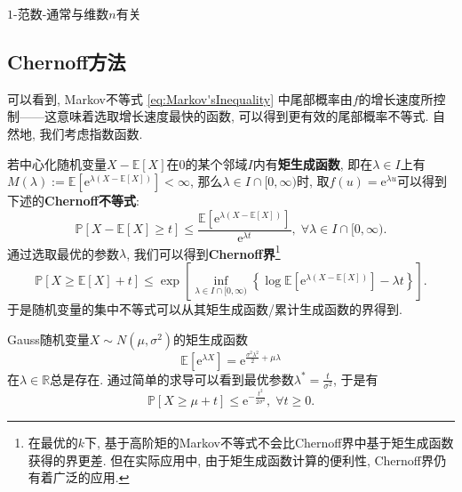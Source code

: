 $1$-范数-通常与维数$n$有关




\subsection{Chernoff方法}

可以看到, Markov不等式 \eqref{eq:Markov'sInequality} 中尾部概率由$f$的增长速度所控制——这意味着选取增长速度最快的函数, 可以得到更有效的尾部概率不等式. 
自然地, 我们考虑指数函数. 

若中心化随机变量$X - \mathbb{E}[X]$在$0$的某个邻域$I$内有\textbf{矩生成函数}, 即在$\lambda \in I$上有$M(\lambda) := \mathbb{E}[\mathrm{e}^{\lambda (X - \mathbb{E}[X])}] < \infty$, 那么$\lambda \in I \cap [0, \infty)$时, 取$f(u) = \mathrm{e}^{\lambda u}$可以得到下述的\textbf{Chernoff不等式}: 
\begin{equation*}
	\mathbb{P}[X - \mathbb{E}[X] \geq t] 
	\leq \frac{\mathbb{E}[\mathrm{e}^{\lambda(X - \mathbb{E}[X])}]}{\mathrm{e}^{\lambda t}},\;
	\forall \lambda \in I \cap [0, \infty).
\end{equation*}
通过选取最优的参数$\lambda$, 我们可以得到\textbf{Chernoff界}\footnote{在最优的$k$下, 基于高阶矩的Markov不等式不会比Chernoff界中基于矩生成函数获得的界更差. 但在实际应用中, 由于矩生成函数计算的便利性, Chernoff界仍有着广泛的应用.}
\begin{equation*}
	\mathbb{P}[X \geq \mathbb{E}[X] + t]
	\leq \exp \left[ \inf_{\lambda \in I \cap [0, \infty)} \left\{ \log \mathbb{E}[\mathrm{e}^{\lambda(X - \mathbb{E}[X])}] - \lambda t \right\} \right]. 
\end{equation*}
于是随机变量的集中不等式可以从其矩生成函数/累计生成函数的界得到. 

\begin{example}[Gauss随机变量的上偏差不等式]
	Gauss随机变量$X \sim N(\mu, \sigma^2)$的矩生成函数
	\begin{equation}
		\mathbb{E}[\mathrm{e}^{\lambda X}] = \mathrm{e}^{\frac{\sigma^2 \lambda^2}{2} + \mu \lambda} 		
	\end{equation}
	在$\lambda \in \mathbb{R}$总是存在. 
	通过简单的求导可以看到最优参数$\lambda^* = \frac{t}{\sigma^2}$, 于是有
	\begin{equation}\label{eq:UpperDeviationOfSubGuassianRV}
		\mathbb{P}[X \geq \mu + t] \leq \mathrm{e}^{- \frac{t^2}{2 \sigma^2}},\; \forall t \geq 0. 
	\end{equation}
\end{example}

